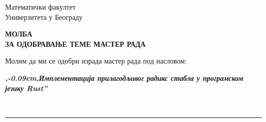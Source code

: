 \documentclass[a4paper]{article}
\def\zn{,\kern-0.09em,}
\begin{document}
\thispagestyle{empty}

\begin{flushleft}
Математички факултет\\
Универзитета у Београду
\end{flushleft}

\bigskip

\begin{center}
\textbf{МОЛБА\\
ЗА ОДОБРАВАЊЕ ТЕМЕ МАСТЕР РАДА
}\end{center}

\bigskip

\begin{flushleft}
Молим да ми се одобри израда мастер рада под насловом:
\end{flushleft}

\begin{minipage}{16.5cm}
\textbf{\textit{\zn Имплементација прилагодљивог радикс стабла у програмском језику \emph{Rust}''}}
\end{minipage}\\
\rule[4mm]{17.5cm}{.05mm}
\end{document}
